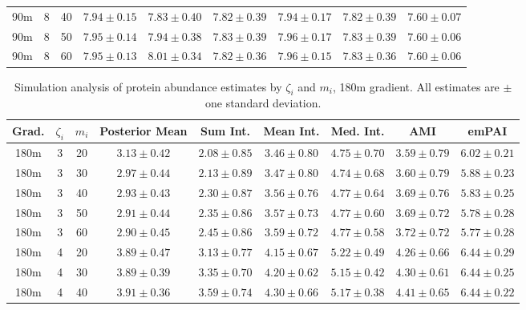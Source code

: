 \begin{table}
\begin{center}
\begin{tabular}{ccc|c|ccccc}
  90m &   8 &  40 & $7.94 \pm 0.15$ & $7.83 \pm 0.40$ & $7.82 \pm 0.39$ & $7.94 \pm 0.17$ & $7.82 \pm 0.39$ & $7.60 \pm 0.07$ \\ 
  90m &   8 &  50 & $7.95 \pm 0.14$ & $7.94 \pm 0.38$ & $7.83 \pm 0.39$ & $7.96 \pm 0.17$ & $7.83 \pm 0.39$ & $7.60 \pm 0.06$ \\ 
  90m &   8 &  60 & $7.95 \pm 0.13$ & $8.01 \pm 0.34$ & $7.82 \pm 0.36$ & $7.96 \pm 0.15$ & $7.83 \pm 0.36$ & $7.60 \pm 0.06$ \\ 
   \hline
\end{tabular}
\end{center}
\end{table}


\begin{table}
\begin{center}
\caption{Simulation analysis of protein abundance estimates by $\zeta_i$ and $m_i$, 180m gradient. All estimates are $\pm$ one standard deviation. \label{tab:sim_estimates_180m}}
\begin{tabular}{ccc|c|ccccc}
 Grad. & $\zeta_i$ & $m_i$ & Posterior Mean & Sum Int. & Mean Int. & Med. Int. & AMI & emPAI \\ 
 \hline
180m &   3 &  20 & $3.13 \pm 0.42$ & $2.08 \pm 0.85$ & $3.46 \pm 0.80$ & $4.75 \pm 0.70$ & $3.59 \pm 0.79$ & $6.02 \pm 0.21$ \\ 
  180m &   3 &  30 & $2.97 \pm 0.44$ & $2.13 \pm 0.89$ & $3.47 \pm 0.80$ & $4.74 \pm 0.68$ & $3.60 \pm 0.79$ & $5.88 \pm 0.23$ \\ 
  180m &   3 &  40 & $2.93 \pm 0.43$ & $2.30 \pm 0.87$ & $3.56 \pm 0.76$ & $4.77 \pm 0.64$ & $3.69 \pm 0.76$ & $5.83 \pm 0.25$ \\ 
  180m &   3 &  50 & $2.91 \pm 0.44$ & $2.35 \pm 0.86$ & $3.57 \pm 0.73$ & $4.77 \pm 0.60$ & $3.69 \pm 0.72$ & $5.78 \pm 0.28$ \\ 
  180m &   3 &  60 & $2.90 \pm 0.45$ & $2.45 \pm 0.86$ & $3.59 \pm 0.72$ & $4.77 \pm 0.58$ & $3.72 \pm 0.72$ & $5.77 \pm 0.28$ \\ 
   \hline
180m &   4 &  20 & $3.89 \pm 0.47$ & $3.13 \pm 0.77$ & $4.15 \pm 0.67$ & $5.22 \pm 0.49$ & $4.26 \pm 0.66$ & $6.44 \pm 0.29$ \\ 
  180m &   4 &  30 & $3.89 \pm 0.39$ & $3.35 \pm 0.70$ & $4.20 \pm 0.62$ & $5.15 \pm 0.42$ & $4.30 \pm 0.61$ & $6.44 \pm 0.25$ \\ 
  180m &   4 &  40 & $3.91 \pm 0.36$ & $3.59 \pm 0.74$ & $4.30 \pm 0.66$ & $5.17 \pm 0.38$ & $4.41 \pm 0.65$ & $6.44 \pm 0.22$ \\ 

\end{tabular}
\end{center}
\end{table}

